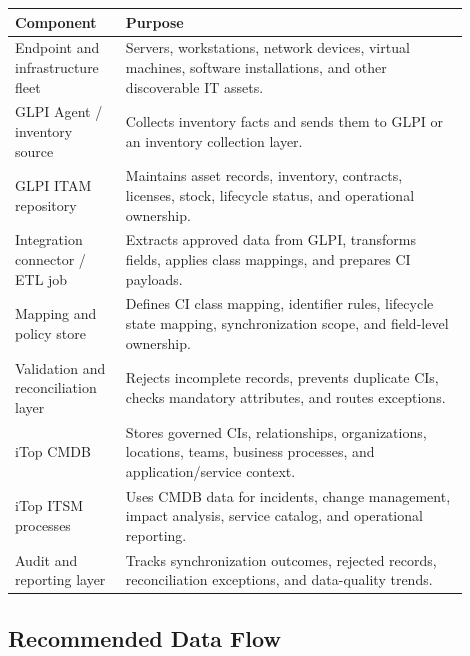 \documentclass[11pt]{article}
\begin{document}
\begin{longtable}{p{0.22\linewidth}p{0.68\linewidth}}
\toprule
\rowcolor{LightBlue}\textbf{Component} & \textbf{Purpose} \\
\midrule
Endpoint and infrastructure fleet & Servers, workstations, network devices, virtual machines, software installations, and other discoverable IT assets. \\
GLPI Agent / inventory source & Collects inventory facts and sends them to GLPI or an inventory collection layer. \\
GLPI ITAM repository & Maintains asset records, inventory, contracts, licenses, stock, lifecycle status, and operational ownership. \\
Integration connector / ETL job & Extracts approved data from GLPI, transforms fields, applies class mappings, and prepares CI payloads. \\
Mapping and policy store & Defines CI class mapping, identifier rules, lifecycle state mapping, synchronization scope, and field-level ownership. \\
Validation and reconciliation layer & Rejects incomplete records, prevents duplicate CIs, checks mandatory attributes, and routes exceptions. \\
iTop CMDB & Stores governed CIs, relationships, organizations, locations, teams, business processes, and application/service context. \\
iTop ITSM processes & Uses CMDB data for incidents, change management, impact analysis, service catalog, and operational reporting. \\
Audit and reporting layer & Tracks synchronization outcomes, rejected records, reconciliation exceptions, and data-quality trends. \\
\bottomrule
\end{longtable}

\subsection{Recommended Data Flow}
\end{document}
